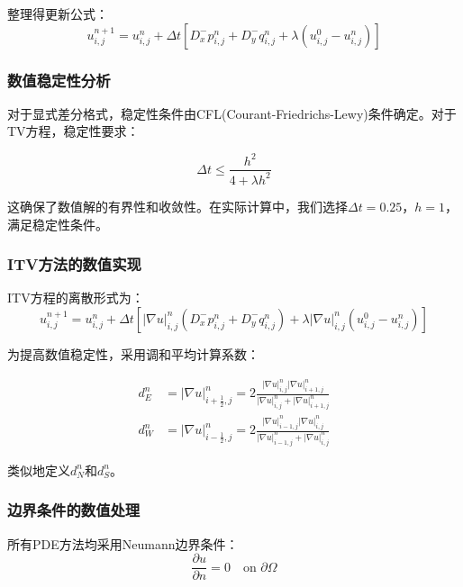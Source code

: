 \documentclass[a4paper,12pt]{ctexart}
\begin{document}
整理得更新公式：
\begin{equation}
u_{i,j}^{n+1} = u_{i,j}^n + \Delta t \left[ D_x^- p_{i,j}^n + D_y^- q_{i,j}^n + \lambda(u_{i,j}^0 - u_{i,j}^n) \right]
\end{equation}

\subsubsection{数值稳定性分析}

对于显式差分格式，稳定性条件由CFL(Courant-Friedrichs-Lewy)条件确定。对于TV方程，稳定性要求：

\begin{equation}
\Delta t \leq \frac{h^2}{4 + \lambda h^2}
\end{equation}

这确保了数值解的有界性和收敛性。在实际计算中，我们选择$\Delta t = 0.25$，$h = 1$，满足稳定性条件。

\subsubsection{ITV方法的数值实现}

ITV方程的离散形式为：
\begin{equation}
u_{i,j}^{n+1} = u_{i,j}^n + \Delta t \left[ |\nabla u|_{i,j}^n (D_x^- p_{i,j}^n + D_y^- q_{i,j}^n) + \lambda |\nabla u|_{i,j}^n (u_{i,j}^0 - u_{i,j}^n) \right]
\end{equation}

为提高数值稳定性，采用调和平均计算系数：

\begin{align}
d_E^n &= |\nabla u|_{i+\frac{1}{2},j}^n = 2\frac{|\nabla u|_{i,j}^n |\nabla u|_{i+1,j}^n}{|\nabla u|_{i,j}^n + |\nabla u|_{i+1,j}^n} \\
d_W^n &= |\nabla u|_{i-\frac{1}{2},j}^n = 2\frac{|\nabla u|_{i-1,j}^n |\nabla u|_{i,j}^n}{|\nabla u|_{i-1,j}^n + |\nabla u|_{i,j}^n}
\end{align}

类似地定义$d_N^n$和$d_S^n$。

\subsubsection{边界条件的数值处理}

所有PDE方法均采用Neumann边界条件：
\begin{equation}
\frac{\partial u}{\partial n} = 0 \quad \text{on } \partial\Omega
\end{equation}
\end{document}
